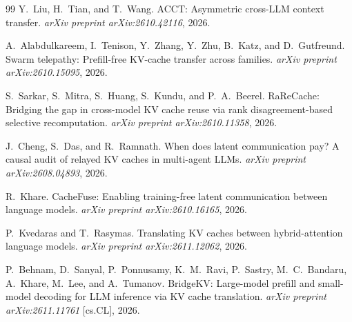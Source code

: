 \documentclass[11pt,a4paper]{article}
\begin{document}
\begin{thebibliography}{99}
 Y.~Liu, H.~Tian, and T.~Wang. ACCT: Asymmetric cross-LLM
context transfer. \emph{arXiv preprint arXiv:2610.42116}, 2026.

 A.~Alabdulkareem, I.~Tenison, Y.~Zhang, Y.~Zhu,
B.~Katz, and D.~Gutfreund. Swarm telepathy: Prefill-free KV-cache transfer
across families. \emph{arXiv preprint arXiv:2610.15095}, 2026.

 S.~Sarkar, S.~Mitra, S.~Huang, S.~Kundu, and P.~A.~Beerel.
RaReCache: Bridging the gap in cross-model KV cache reuse via rank
disagreement-based selective recomputation. \emph{arXiv preprint
arXiv:2610.11358}, 2026.

 J.~Cheng, S.~Das, and R.~Ramnath. When does latent
communication pay? A causal audit of relayed KV caches in multi-agent LLMs.
\emph{arXiv preprint arXiv:2608.04893}, 2026.

 R.~Khare. CacheFuse: Enabling training-free latent
communication between language models. \emph{arXiv preprint
arXiv:2610.16165}, 2026.

 P.~Kvedaras and T.~Rasymas. Translating KV caches between
hybrid-attention language models. \emph{arXiv preprint arXiv:2611.12062}, 2026.

 P.~Behnam, D.~Sanyal, P.~Ponnusamy, K.~M.~Ravi, P.~Sastry,
M.~C.~Bandaru, A.~Khare, M.~Lee, and A.~Tumanov. BridgeKV: Large-model prefill
and small-model decoding for LLM inference via KV cache translation.
\emph{arXiv preprint arXiv:2611.11761} [cs.CL], 2026.

\end{thebibliography}
\end{document}
